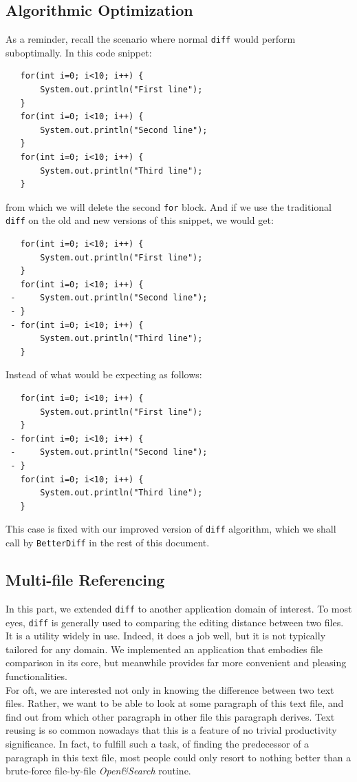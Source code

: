 \documentclass{article}
\begin{document}
\subsection{Algorithmic Optimization}
As a reminder, recall the scenario where normal \texttt{diff} would perform suboptimally. In this code snippet:\\
\begin{lstlisting}
   for(int i=0; i<10; i++) {
       System.out.println("First line");
   }
   for(int i=0; i<10; i++) {
       System.out.println("Second line");
   }
   for(int i=0; i<10; i++) {
       System.out.println("Third line");
   }
\end{lstlisting}
from which we will delete the second \texttt{for} block. And if we use the traditional \texttt{diff} on the old and new versions of this snippet, we would get:\\
\pagebreak
\begin{lstlisting}
   for(int i=0; i<10; i++) {
       System.out.println("First line");
   }
   for(int i=0; i<10; i++) {
 -     System.out.println("Second line");
 - }
 - for(int i=0; i<10; i++) {
       System.out.println("Third line");
   }
\end{lstlisting}
Instead of what would be expecting as follows:
\begin{lstlisting}
   for(int i=0; i<10; i++) {
       System.out.println("First line");
   }
 - for(int i=0; i<10; i++) {
 -     System.out.println("Second line");
 - }
   for(int i=0; i<10; i++) {
       System.out.println("Third line");
   }
\end{lstlisting}
This case is fixed with our improved version of \texttt{diff} algorithm, which we shall call by \texttt{BetterDiff} in the rest of this document. \\

\subsection{Multi-file Referencing}
In this part, we extended \texttt{diff} to another application domain of interest. To most eyes, \texttt{diff} is generally used to comparing the editing distance between two files. It is a utility widely in use. Indeed, it does a job well, but it is not typically tailored for any domain. We implemented an application that embodies file comparison in its core, but meanwhile provides far more convenient and pleasing functionalities. \\

For oft, we are interested not only in knowing the difference between two text files. Rather, we want to be able to look at some paragraph of this text file, and find out from which other paragraph in other file this paragraph derives. Text reusing is so common nowadays that this is a feature of no trivial productivity significance. In fact, to fulfill such a task, of finding the predecessor of a paragraph in this text file, most people could only resort to nothing better than a brute-force file-by-file \textit{Open\&Search} routine. \\
\end{document}
